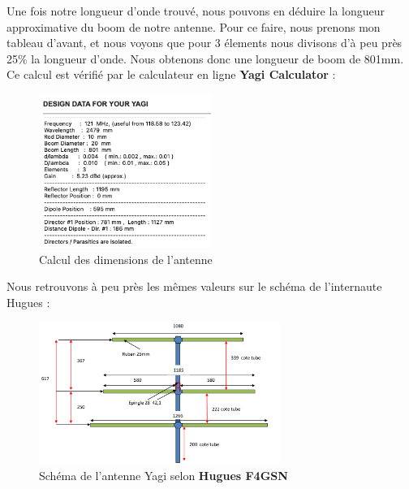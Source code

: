 \documentclass[12pt, a4paper]{article}
\begin{document}
\newpage
Une fois notre longueur d'onde trouvé, nous 
pouvons en déduire la longueur approximative du boom 
de notre antenne. Pour ce faire, nous prenons 
mon tableau d'avant, et nous voyons que pour 3 élements
nous divisons d'à peu près 25\% la longueur d'onde. Nous obtenons
donc une longueur de boom de 801mm.\\
Ce calcul est vérifié par le calculateur en ligne 
\textbf{Yagi Calculator} :
\begin{figure}[h]
    \centering
    \includegraphics[width=0.5\textwidth]{img/calc.png}
    \caption{Calcul des dimensions de l'antenne}
    \label{fig:calcul}
\end{figure}

Nous retrouvons à peu près les mêmes valeurs sur le schéma
de l'internaute Hugues :
\begin{figure}[h]
    \centering
    \includegraphics[width=0.7\textwidth]{img/boom.png}
    \caption{Schéma de l'antenne Yagi selon \textbf{Hugues F4GSN}}
    \label{fig:antenne}
\end{figure}
\end{document}
